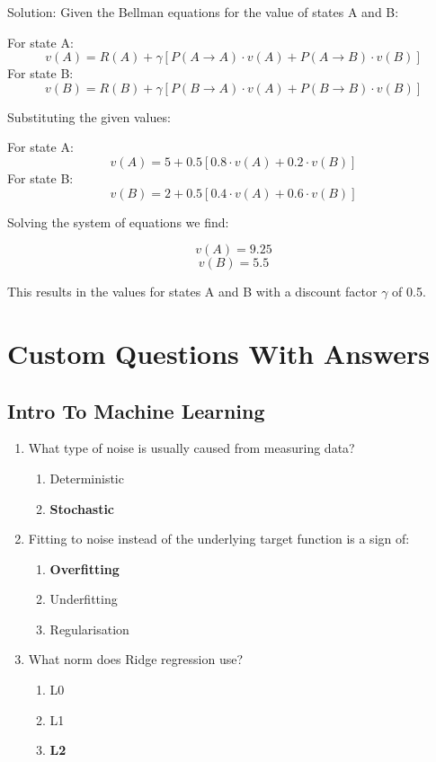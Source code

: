 \documentclass{report}
\numberwithin{equation}{section}
\begin{document}
\begin{enumerate}
Solution: Given the Bellman equations for the value of states A and B:

For state A:
\[ v(A) = R(A) + \gamma \left[ P(A \rightarrow A) \cdot v(A) + P(A \rightarrow B) \cdot v(B) \right] \]
For state B:
\[ v(B) = R(B) + \gamma \left[ P(B \rightarrow A) \cdot v(A) + P(B \rightarrow B) \cdot v(B) \right] \]

Substituting the given values:

For state A:
\[ v(A) = 5 + 0.5 \left[ 0.8 \cdot v(A) + 0.2 \cdot v(B) \right] \]
For state B:
\[ v(B) = 2 + 0.5 \left[ 0.4 \cdot v(A) + 0.6 \cdot v(B) \right] \]

Solving the system of equations we find:

\[ v(A) = 9.25 \]
\[ v(B) = 5.5 \]

This results in the values for states A and B with a discount factor \( \gamma \) of 0.5.
\end{enumerate}


\chapter{Custom Questions With Answers}
\section{Intro To Machine Learning}
\begin{enumerate}
    \item What type of noise is usually caused from measuring data?
    \begin{enumerate}[label=\alph*.]
        \item Deterministic
        \item \textbf{Stochastic}
    \end{enumerate}
    \item Fitting to noise instead of the underlying target function is a sign of:
    \begin{enumerate}[label=\alph*.]
        \item \textbf{Overfitting}
        \item Underfitting
        \item Regularisation
    \end{enumerate}
    \item What norm does Ridge regression use?
    \begin{enumerate}[label=\alph*.]
        \item L0
        \item L1
        \item \textbf{L2}
    \end{enumerate}
\end{enumerate}
\end{document}
